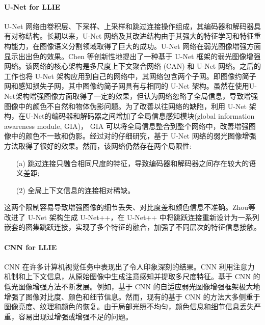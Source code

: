 \documentclass[a4paper, 10pt]{article}
\begin{document}
		\paragraph{U-Net for LLIE}
		
		U-Net 网络由卷积层、下采样、上采样和跳过连接操作组成，其编码器和解码器具有对称结构。长期以来，U-Net 网络及其改进结构由于其强大的特征学习和特征重构能力，在图像语义分割领域取得了巨大的成功。U-Net 网络在弱光图像增强方面显示出出色的效果。Chen 等\cite{chen2018learning}创新性地提出了一种基于 U-Net 框架的弱光图像增强网络。该网络的核心架构是多尺度上下文聚合网络 (CAN) 和 U-Net 网络。之后的工作\cite{chen2018learning, zamir2021learning}也将 U-Net 架构应用到自己的网络中，其网络包含两个子网。即图像约简子网和感知损失子网，其中图像约简子网具有与\cite{chen2018learning}相同的 U-Net 架构。虽然\cite{chen2018learning, zamir2021learning}在使用U-Net架构增强图像方面取得了一定的效果，但\cite{meng2020gia}认为\cite{chen2018learning, zamir2021learning}网络忽略了全局信息，导致增强图像中的颜色不自然和物体伪影问题。为了改善以往网络的缺陷，利用 U-Net 架构，\cite{meng2020gia}在U-Net的编码器和解码器之间增加了全局信息感知模块(global information awareness module, GIA)， GIA 可以将全局信息整合到整个网络中，改善增强图像中的颜色不一致和伪影。经过对\cite{chen2018learning, meng2020gia, zamir2021learning}的仔细研究，基于 U-Net 网络的弱光图像增强方法取得了很好的效果。然而，该网络仍然存在两个局限性:
		
		\begin{itemize}
			\item[(a)] 
			跳过连接只融合相同尺度的特征，导致编码器和解码器之间存在较大的语义差距;
			
			\item[(2)]
			全局上下文信息的连接相对稀缺。
		\end{itemize}	
		
		这两个限制容易导致增强图像的细节丢失、对比度差和颜色信息不准确。Zhou等\cite{zhou2018unet++,zhou2019unet++}改进了 U-Net 架构生成 U-Net++，在 U-Net++ 中将跳跃连接重新设计为一系列嵌套的密集跳跃连接，实现了多个特征的融合，加强了不同层次的特征信息接触。

		\paragraph{CNN for LLIE}
		
		CNN 在许多计算机视觉任务中表现出了令人印象深刻的结果。CNN 利用注意力机制\cite{yang2021locally, zhang2020attention}和上下文信息，从原始图像中生成注意感知并提取多尺度特征\cite{li2018multi,zamir2020learning}。基于 CNN 的低光图像增强方法不断发展。例如，基于 CNN 的自适应弱光图像增强框架\cite{li2020visual}极大地增强了图像对比度、颜色和细节信息。然而，现有的基于 CNN 的方法大多侧重于图像亮度、纹理和颜色的恢复\cite{xu2020learning}。由于局部光照不均匀，颜色信息和细节信息丢失严重，容易出现过增强或增强不足的问题。
		
\end{document}
